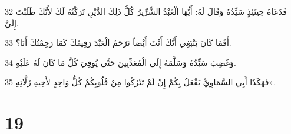 \par 32 فَدَعَاهُ حِينَئِذٍ سَيِّدُهُ وَقَالَ لَهُ: أَيُّهَا الْعَبْدُ الشِّرِّيرُ كُلُّ ذَلِكَ الدَّيْنِ تَرَكْتُهُ لَكَ لأَنَّكَ طَلَبْتَ إِلَيَّ.
\par 33 أَفَمَا كَانَ يَنْبَغِي أَنَّكَ أَنْتَ أَيْضاً تَرْحَمُ الْعَبْدَ رَفِيقَكَ كَمَا رَحِمْتُكَ أَنَا؟.
\par 34 وَغَضِبَ سَيِّدُهُ وَسَلَّمَهُ إِلَى الْمُعَذِّبِينَ حَتَّى يُوفِيَ كُلَّ مَا كَانَ لَهُ عَلَيْهِ.
\par 35 فَهَكَذَا أَبِي السَّمَاوِيُّ يَفْعَلُ بِكُمْ إِنْ لَمْ تَتْرُكُوا مِنْ قُلُوبِكُمْ كُلُّ وَاحِدٍ لأَخِيهِ زَلَّاتِهِ».

\chapter{19}


